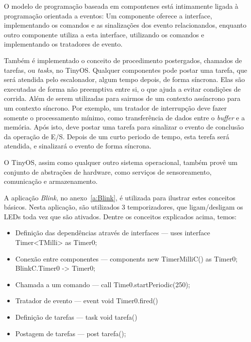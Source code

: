 O modelo de programação baseada em compontenes está intimamente ligada à programação orientada a eventos: Um componente
oferece a interface, implementando os comandos e as sinalizações dos evento relacionandos, enquanto outro componente
utiliza a esta interface, utilizando os comandos e implementando os tratadores de evento.

Também é implementado o conceito de procedimento postergados, chamados de tarefas, ou \textit{tasks}, no TinyOS. Qualquer
componentes pode postar uma tarefa, que será atendida pelo escalonador, algum tempo depois, de forma síncrona.  Elas são 
executadas de forma não preemptiva entre si, o que ajuda a evitar condições de corrida. Além de serem utilizadas para
sairmos de um contexto assíncrono para um contexto síncrono. 
Por exemplo, um tratador de interrupção deve fazer somente o processamento mínimo, como transferência de dados entre o
\textit{buffer} e a memória. Após isto, deve postar uma tarefa para sinalizar o evento 
de conclusão da operação de E/S. Depois de um curto periodo de tempo, esta terefa será atendida, e sinalizará o evento de 
forma síncrona.

O TinyOS, assim como qualquer outro sistema operacional, também provê um conjunto de abstrações de hardware, como serviços 
de sensoreamento, comunicação e armazenamento.

A aplicação \textit{Blink}, no anexo~\ref{a:Blink}, é utilizada para ilustrar estes conceitos básicos. Nesta aplicação, são utilizados
3 temporizadores, que ligam/desligam os LEDs toda vez que são ativados. Dentre os conceitos explicados acima, temos:
\begin{itemize}
\item Definição das dependências através de interfaces --- uses interface Timer<TMilli> as Timer0;
\item Conexão entre componentes --- components new TimerMilliC() as Timer0; \hfill \\
        BlinkC.Timer0 -> Timer0;
\item Chamada a um comando --- call Time0.startPeriodic(250);
\item Tratador de evento --- event void Timer0.fired()
\item Definição de tarefas --- task void tarefa()
\item Postagem de tarefas --- post tarefa();
\end{itemize}
